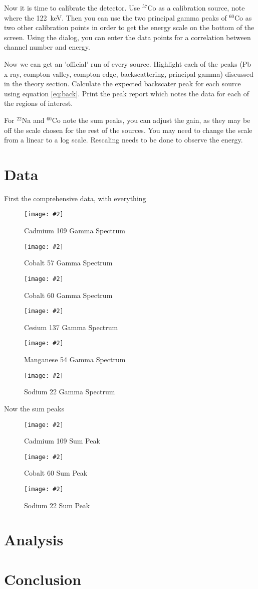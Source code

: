 \documentclass[letterpaper,12pt]{article}
\newcommand{\labfig}[4]{
  \begin{figure}[H]
    \centering
    \texttt{[image: \#2]}
    \caption{#3}
    \label{#4}
  \end{figure}}
\begin{document}
Now it is time to calibrate the detector. Use $^{57}$Co as a calibration source, note where the \SI{122}{\kilo\eV}. Then you can use the two principal gamma peaks of $^{60}$Co as two other calibration points in order to get the energy scale on the bottom of the screen. Using the dialog, you can enter the data points for a correlation between channel number and energy.

Now we can get an 'official' run of every source. Highlight each of the peaks (Pb x ray, compton valley, compton edge, backscattering, principal gamma) discussed in the theory section. Calculate the expected backscater peak for each source using equation \eqref{eq:back}. Print the peak report which notes the data for each of the regions of interest.

For $^{22}$Na and $^{60}$Co note the sum peaks, you can adjust the gain, as they may be off the scale chosen for the rest of the sources. You may need to change the scale from a linear to a log scale. Rescaling needs to be done to observe the energy. 
\section{Data}
First the comprehensive data, with everything
\labfig{14.5}{Cd_109_Plot}{Cadmium 109 Gamma Spectrum}{cd109}
\labfig{14.5}{Co_57_Plot}{Cobalt 57 Gamma Spectrum}{co57}
\labfig{14.5}{Co_60_Plot}{Cobalt 60 Gamma Spectrum}{co60}
\labfig{14.5}{Cs_137_Plot}{Cesium 137 Gamma Spectrum}{cs137}
\labfig{14.5}{Mn_54_Plot}{Manganese 54 Gamma Spectrum}{mn54}
\labfig{14.5}{Na_22_Plot}{Sodium 22 Gamma Spectrum}{na22}
Now the sum peaks
\labfig{14.5}{Cd_109_Sum_Peaks}{Cadmium 109 Sum Peak}{sumcd109}
\labfig{14.5}{Co_60_Sum_Peaks}{Cobalt 60 Sum Peak}{sumco60}
\labfig{14.5}{Na_22_Sum_Peak}{Sodium 22 Sum Peak}{sumna22}
\section{Analysis}
\section{Conclusion}




\end{document}
